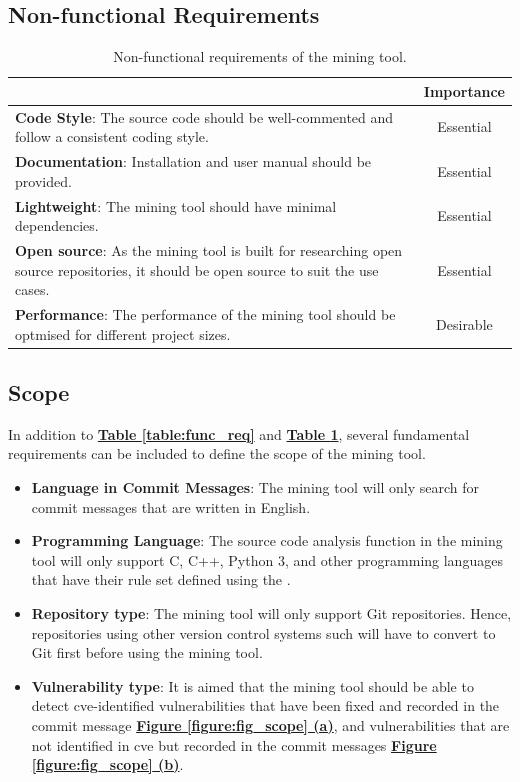 \documentclass[12pt, a4paper]{report}
\begin{document}
\subsection{Non-functional Requirements}
\begin{table}[H]
  \centering
  \begin{tabular}{|p{10.3cm}|c|}
    \hline
    \rowcolor[HTML]{D8D8D8}
    \multicolumn{1}{|c|}{Criteria} & Importance \\ \hline
    \textbf{Code Style}: The source code should be well-commented and follow a consistent coding
    style. & Essential  \\ \hline
    \textbf{Documentation}: Installation and user manual should be provided. & Essential \\ \hline
    \textbf{Lightweight}: The mining tool should have minimal dependencies. & Essential \\ \hline
    \textbf{Open source}: As the mining tool is built for researching open source repositories, it
    should be open source to suit the use cases. & Essential \\ \hline
    \textbf{Performance}: The performance of the mining tool should be optmised for different
    project sizes. & Desirable \\ \hline
  \end{tabular}
  \caption{Non-functional requirements of the mining tool.} \label{table:nonfunc_req}
\end{table}

\subsection{Scope}
In addition to \hyperref[table:func_req]{\textbf{Table \ref*{table:func_req}}} and
\hyperref[table:nonfunc_req]{\textbf{Table \ref*{table:nonfunc_req}}}, several fundamental
requirements can be included to define the scope of the mining tool.

\begin{itemize}
  \item \textbf{Language in Commit Messages}: The mining tool will only search for commit messages
  that are written in English.
  \item \textbf{Programming Language}: The source code analysis function in the mining tool will
  only support C, C++, Python 3, and other programming languages that have their rule set defined
  using the .
  \item \textbf{Repository type}: The mining tool will only support Git repositories. Hence,
  repositories using other version control systems such will have to convert to Git first before
  using the mining tool.
  \item \textbf{Vulnerability type}: It is aimed that the mining tool should be able to detect
  \acrshort{cve}-identified vulnerabilities that have been fixed and recorded in the commit message
  \hyperref[figure:cve_vuln]{\textbf{Figure \ref*{figure:fig_scope} (a)}}, and vulnerabilities that
  are not identified in \acrshort{cve} but recorded in the commit messages
  \hyperref[figure:common_vuln]{\textbf{Figure \ref*{figure:fig_scope} (b)}}.
\end{itemize}
\end{document}
